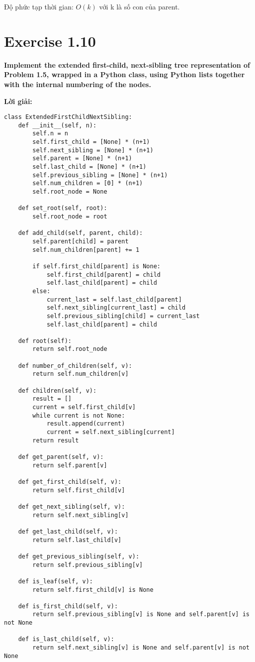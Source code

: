 \documentclass[12pt]{article}
\begin{document}
Độ phức tạp thời gian: $O(k)$ với k là số con của parent.

\section{Exercise 1.10}
\textbf{Implement the extended first-child, next-sibling tree representation of Problem 1.5, wrapped in a Python class, using Python lists together with the internal numbering of the nodes.}

\textbf{Lời giải:}

\begin{lstlisting}
class ExtendedFirstChildNextSibling:
    def __init__(self, n):
        self.n = n
        self.first_child = [None] * (n+1)
        self.next_sibling = [None] * (n+1)
        self.parent = [None] * (n+1)
        self.last_child = [None] * (n+1)
        self.previous_sibling = [None] * (n+1)
        self.num_children = [0] * (n+1)
        self.root_node = None
    
    def set_root(self, root):
        self.root_node = root
    
    def add_child(self, parent, child):
        self.parent[child] = parent
        self.num_children[parent] += 1
        
        if self.first_child[parent] is None:
            self.first_child[parent] = child
            self.last_child[parent] = child
        else:
            current_last = self.last_child[parent]
            self.next_sibling[current_last] = child
            self.previous_sibling[child] = current_last
            self.last_child[parent] = child
    
    def root(self):
        return self.root_node
    
    def number_of_children(self, v):
        return self.num_children[v]
    
    def children(self, v):
        result = []
        current = self.first_child[v]
        while current is not None:
            result.append(current)
            current = self.next_sibling[current]
        return result
    
    def get_parent(self, v):
        return self.parent[v]
    
    def get_first_child(self, v):
        return self.first_child[v]
    
    def get_next_sibling(self, v):
        return self.next_sibling[v]
    
    def get_last_child(self, v):
        return self.last_child[v]
    
    def get_previous_sibling(self, v):
        return self.previous_sibling[v]
    
    def is_leaf(self, v):
        return self.first_child[v] is None
    
    def is_first_child(self, v):
        return self.previous_sibling[v] is None and self.parent[v] is not None
    
    def is_last_child(self, v):
        return self.next_sibling[v] is None and self.parent[v] is not None
\end{lstlisting}
\end{document}
